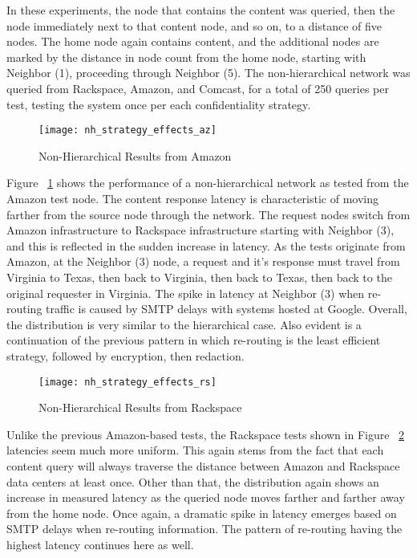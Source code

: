 In these experiments, the node that contains the content was queried, then the node immediately next to that content node, and so on, to a distance of five nodes.  The home node again contains content, and the additional nodes are marked by the distance in node count from the home node, starting with Neighbor (1), proceeding through Neighbor (5).  The non-hierarchical network was queried from Rackspace, Amazon, and Comcast, for a total of 250 queries per test, testing the system once per each confidentiality strategy.

\begin{figure}[!t]
\centering
\texttt{[image: nh\_strategy\_effects\_az]}
\caption{Non-Hierarchical Results from Amazon}
\label{fig:model:nh-amazon-results}
\end{figure}

Figure ~\ref{fig:model:nh-amazon-results} shows the performance of a non-hierarchical network as tested from the Amazon test node.  The content response latency is characteristic of moving farther from the source node through the network.  The request nodes switch from Amazon infrastructure to Rackspace infrastructure starting with Neighbor (3), and this is reflected in the sudden increase in latency.  As the tests originate from Amazon, at the Neighbor (3) node, a request and it's response must travel from Virginia to Texas, then back to Virginia, then back to Texas, then back to the original requester in Virginia.  The spike in latency at Neighbor (3) when re-routing traffic is caused by SMTP delays with systems hosted at Google.  Overall, the distribution is very similar to the hierarchical case.  Also evident is a continuation of the previous pattern in which re-routing is the least efficient strategy, followed by encryption, then redaction.

\begin{figure}[!t]
\centering
\texttt{[image: nh\_strategy\_effects\_rs]}
\caption{Non-Hierarchical  Results from Rackspace}
\label{fig:model:nh-rackspace-results}
\end{figure}

Unlike the previous Amazon-based tests, the Rackspace tests shown in Figure ~\ref{fig:model:nh-rackspace-results} latencies seem much more uniform.  This again stems from the fact that each content query will always traverse the distance between Amazon and Rackspace data centers at least once.  Other than that, the distribution again shows an increase in measured latency as the queried node moves farther and farther away from the home node.  Once again, a dramatic spike in latency emerges based on SMTP delays when re-routing information.  The pattern of re-routing having the highest latency continues here as well.

